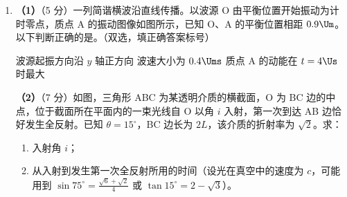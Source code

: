 \documentclass[\gkver]{gaokaozhenti}
\begin{document}
\begin{enumerate}
{$P_{1}=P_{0}+\rho gh_{1}$ ③

$P_{2}=P_{0}+\rho gh_{2}$ ④

在此过程中筒内气体温度和质量不变，由玻意耳定律得

$P_{1}V_{1}=P_{2}V_{2}$ ⑤

联立②③④⑤式，代入数据得

$h_{2}=10\Um$ ⑥
}

\item
\textbf{（1）}（5 分）一列简谐横波沿直线传播。以波源 O 由平衡位置开始振动为计时零点，质点 A 的振动图像如图所示，已知 O、A 的平衡位置相距 $0.9\Um$。以下判断正确的是。（双选，填正确答案标号）

{波源起振方向沿 $y$ 轴正方向}
{波速大小为 $0.4\Ums$}
{质点 A 的动能在 $t=4\Us$ 时最大}


\textbf{（2）}（7 分）如图，三角形 ABC 为某透明介质的横截面，O 为 BC 边的中点，位于截面所在平面内的一束光线自 O 以角 $i$ 入射，第一次到达 AB 边恰好发生全反射。已知 $\theta=15^{\circ}$，BC 边长为 $2L$，该介质的折射率为 $\sqrt{2}$。求：
\begin{enumerate}
	\item
	入射角 $i$；
	\item
	从入射到发生第一次全反射所用的时间（设光在真空中的速度为 $c$，可能用到 $\sin75^{\circ}=\frac{\sqrt{6}+\sqrt{2}}{4}$ 或 $\tan15^{\circ}=2-\sqrt{3}$）。
\end{enumerate}

\onepicture[align=right, h=3.34cm]{}

\end{enumerate}
\end{document}
